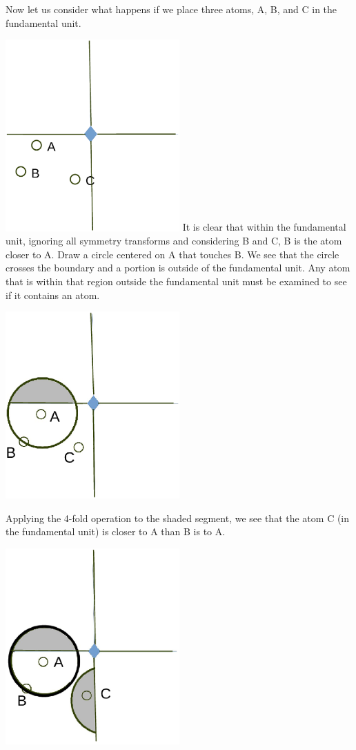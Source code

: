 \documentclass[preprint]{iucr}              %
\numberwithin{equation}{section}
\begin{document}
	Now let us consider what happens if we place three atoms, A, B,  and C in the fundamental unit.
	
		\includegraphics[width = 0.5\textwidth ]{4_3}
		\label{4_3}
	It is clear that within the fundamental unit, ignoring all symmetry
	transforms and considering B and C, B is the atom closer to
	A. Draw a circle centered on A that touches B. We see that the
	circle crosses the boundary and a portion is outside of the
	fundamental unit. Any atom that is within that region outside the fundamental unit must be examined to see if it contains
	an atom.
	
	\includegraphics[width = 0.5\textwidth ]{4_5}
	
	Applying the 4-fold operation to the shaded segment, we
	see that the atom C (in the fundamental unit) is closer to A
	than B is to A.
	
	\includegraphics[width = 0.5\textwidth ]{4_5_1}
	
\end{document}
